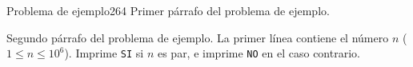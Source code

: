 
\usepackage{verbatim}



\begin{problem}{Problema de ejemplo}{2}{64}
    Primer párrafo del problema de ejemplo.

    Segundo párrafo del problema de ejemplo.
\probleminputformat
    La primer línea contiene el número $n$ ($1 \leq n \leq 10^6$).
\problemoutputformat
    Imprime \texttt{SI} si $n$ es par, e imprime \texttt{NO} en el caso contrario.
    
    \begin{problemexamples}
    \end{problemexamples}
\end{problem}


